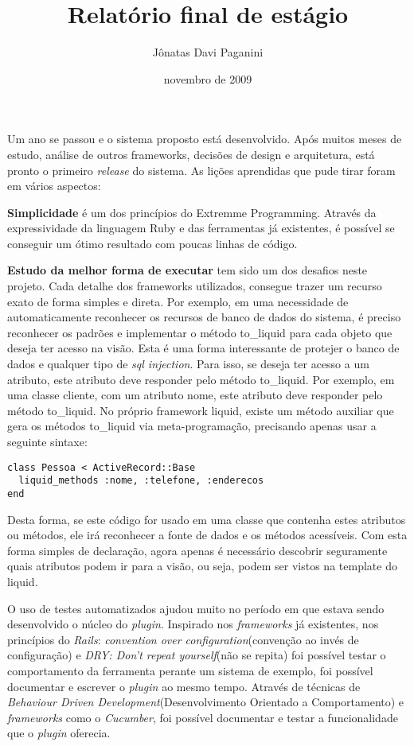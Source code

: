 \documentclass[espaco=simples,appendix=Name]{abnt}
\title{Relatório final de estágio}
\author{Jônatas Davi Paganini}
\date{novembro de 2009}
\begin{document}
\maketitle

 Um ano se passou e o sistema proposto está desenvolvido. Após muitos meses de estudo, análise de outros frameworks, decisões de design e arquitetura, está pronto o primeiro \textit{release} do sistema. As lições aprendidas que pude tirar foram em vários aspectos:

\textbf{Simplicidade} é um dos princípios do Extremme Programming. Através da expressividade da linguagem Ruby e das ferramentas já existentes, é possível se conseguir um ótimo resultado com poucas linhas de código.

\textbf{Estudo da melhor forma de executar} tem sido um dos desafios neste projeto. Cada detalhe dos frameworks utilizados, consegue trazer um recurso exato de forma simples e direta. Por exemplo, em uma necessidade de automaticamente reconhecer os recursos de banco de dados do sistema, é preciso reconhecer os padrões e implementar o método to\_liquid para cada objeto que deseja ter acesso na visão. Esta é uma forma interessante de protejer o banco de dados e qualquer tipo de \textit{sql injection}. Para isso, se deseja ter acesso a um atributo, este atributo deve responder pelo método to\_liquid. Por exemplo, em uma classe cliente, com um atributo nome, este atributo deve responder pelo método to\_liquid. No próprio framework liquid, existe um método auxiliar que gera os métodos to\_liquid via meta-programação, precisando apenas usar a seguinte sintaxe: 

\begin{lstlisting}[caption=Implementação do método to\_liquid através de um método helper]
class Pessoa < ActiveRecord::Base
  liquid_methods :nome, :telefone, :enderecos
end
\end{lstlisting}

Desta forma, se este código for usado em uma classe que contenha estes atributos ou métodos, ele irá reconhecer a fonte de dados e os métodos acessíveis. Com esta forma simples de declaração, agora apenas é necessário descobrir seguramente quais atributos podem ir para a visão, ou seja, podem ser vistos na template do liquid. 

O uso de testes automatizados ajudou muito no período em que estava sendo desenvolvido o núcleo do \textit{plugin}. Inspirado nos \textit{frameworks} já existentes, nos princípios do \textit{Rails}: \textit{convention over configuration}(convenção ao invés de configuração) e \textit{DRY: Don't repeat yourself}(não se repita) foi possível testar o comportamento da ferramenta perante um sistema de exemplo, foi possível documentar e escrever o \textit{plugin} ao mesmo tempo. Através de técnicas de \textit{Behaviour Driven Development}(Desenvolvimento Orientado a Comportamento) e \textit{frameworks} como o \textit{Cucumber}, foi possível documentar e testar a funcionalidade que o \textit{plugin} oferecia. 
\end{document}

